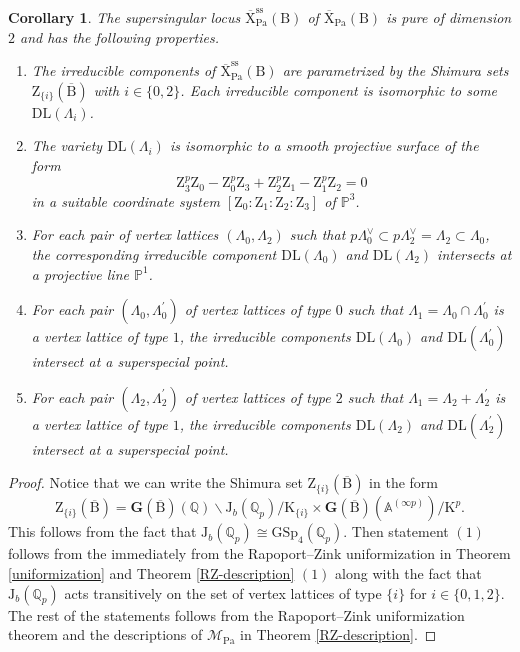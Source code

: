 \documentclass[10pt]{amsart}
\numberwithin{equation}{section}
\newtheorem{corollary}[equation]{Corollary}
\theoremstyle{definition}
\def\GSp{\mathrm{GSp}}
\def\Pa{\mathrm{Pa}}
\def\calM{\mathcal{M}}
\def\bfG{\mathbf{G}}
\def\PP{\mathbb{P}}
\def\QQ{\mathbb{Q}}
\def\rmB{\mathrm{B}}
\def\rmJ{\mathrm{J}}
\def\rmK{\mathrm{K}}
\def\rmX{\mathrm{X}}
\def\rmZ{\mathrm{Z}}
\begin{document}
\begin{corollary}
The supersingular locus $\overline{\rmX}^{\mathrm{ss}}_{\Pa}(\rmB)$ of $\overline{\rmX}_{\Pa}(\rmB)$ is pure of dimension $2$ and has the following properties.
\begin{enumerate} 
\item The irreducible components of  $\overline{\rmX}^{\mathrm{ss}}_{\Pa}(\rmB)$  are parametrized by the Shimura sets $\rmZ_{\{i\}}(\overline{\rmB})$ with $i\in\{0, 2\}$. Each irreducible component  is isomorphic to some $\mathrm{DL}(\Lambda_{i})$. 
\item The variety $\mathrm{DL}(\Lambda_{i})$ is isomorphic to a smooth projective surface of the form 
\begin{equation*}
\rmZ_{3}^{p}\rmZ_{0}-\rmZ^{p}_{0}\rmZ_{3}+\rmZ^{p}_{2}\rmZ_{1}-\rmZ^{p}_{1}\rmZ_{2}=0
\end{equation*}
in a suitable coordinate system $[\rmZ_{0}:\rmZ_{1}: \rmZ_{2}: \rmZ_{3}]$ of $\PP^{3}$.

\item For each pair of vertex lattices $(\Lambda_{0}, \Lambda_{2})$ such that
$p\Lambda^{\vee}_{0}\subset p\Lambda^{\vee}_{2}=\Lambda_{2}\subset \Lambda_{0}$, the corresponding irreducible component $\mathrm{DL}(\Lambda_{0})$ and $\mathrm{DL}(\Lambda_{2})$ intersects at a projective line $\PP^{1}$.

\item For each pair $(\Lambda_{0}, \Lambda^{\prime}_{0})$ of vertex lattices of type $0$ such that $\Lambda_{1}=\Lambda_{0}\cap\Lambda^{\prime}_{0}$ is a vertex lattice of type $1$, the irreducible components $\mathrm{DL}(\Lambda_{0})$ and $\mathrm{DL}(\Lambda^{\prime}_{0})$ intersect at a superspecial point. 

\item For each pair $(\Lambda_{2}, \Lambda^{\prime}_{2})$ of vertex lattices of type $2$ such that $\Lambda_{1}=\Lambda_{2}+\Lambda^{\prime}_{2}$ is a vertex lattice of type $1$, the irreducible components $\mathrm{DL}(\Lambda_{2})$ and $\mathrm{DL}(\Lambda^{\prime}_{2})$ intersect at a superspecial point.

\end{enumerate}
\end{corollary}

\begin{proof}
Notice that we can write the Shimura set $\rmZ_{\{i\}}(\overline{\rmB})$ in the form 
\begin{equation*}
\rmZ_{\{i\}}(\overline{\rmB})=\bfG(\overline{\rmB})(\QQ)\backslash \rmJ_{b}(\QQ_{p})/\rmK_{\{i\}}\times\bfG(\overline{\rmB})(\mathbb{A}^{(\infty p)})/\rmK^{p}. 
\end{equation*}
This follows from the fact that $\rmJ_{b}(\QQ_{p})\cong \GSp_{4}(\QQ_{p})$.  Then statement $(1)$ follows from the immediately from the Rapoport--Zink uniformization in Theorem \ref{uniformization} and Theorem \ref{RZ-description} $(1)$ along with the fact that $\rmJ_{b}(\QQ_{p})$ acts transitively on the set of vertex lattices of type $\{i\}$ for $i\in\{0,1,2\}$.  The rest of the statements follows from the Rapoport--Zink uniformization theorem and the descriptions of $\calM_{\Pa}$ in Theorem \ref{RZ-description}.
\end{proof}
\end{document}

